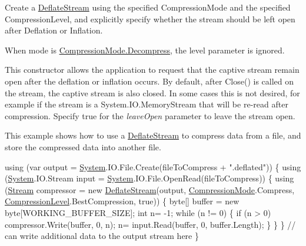Create a {\ttfamily \mbox{\hyperlink{class_super_tiled2_unity_1_1_ionic_1_1_zlib_1_1_deflate_stream}{Deflate\+Stream}}} using the specified {\ttfamily Compression\+Mode} and the specified {\ttfamily Compression\+Level}, and explicitly specify whether the stream should be left open after Deflation or Inflation. 

When mode is {\ttfamily \mbox{\hyperlink{namespace_super_tiled2_unity_1_1_ionic_1_1_zlib_ad5b7635d92497e1c905e5de82eb1c6b1a6d2861192fdf4370bcf95c099be0f2f0}{Compression\+Mode.\+Decompress}}}, the level parameter is ignored. 

This constructor allows the application to request that the captive stream remain open after the deflation or inflation occurs. By default, after {\ttfamily Close()} is called on the stream, the captive stream is also closed. In some cases this is not desired, for example if the stream is a System.\+I\+O.\+Memory\+Stream that will be re-\/read after compression. Specify true for the {\itshape leave\+Open}  parameter to leave the stream open. 

This example shows how to use a {\ttfamily \mbox{\hyperlink{class_super_tiled2_unity_1_1_ionic_1_1_zlib_1_1_deflate_stream}{Deflate\+Stream}}} to compress data from a file, and store the compressed data into another file.


\begin{DoxyCode}
\textcolor{keyword}{using} (var output = \mbox{\hyperlink{namespace_system}{System}}.IO.File.Create(fileToCompress + \textcolor{stringliteral}{".deflated"}))
\{
    \textcolor{keyword}{using} (\mbox{\hyperlink{namespace_system}{System}}.IO.Stream input = \mbox{\hyperlink{namespace_system}{System}}.IO.File.OpenRead(fileToCompress))
    \{
        \textcolor{keyword}{using} (\mbox{\hyperlink{namespace_super_tiled2_unity_1_1_ionic_1_1_zip_a9ced5352c56e7e0fceff15b534073c83aeae835e83c0494a376229f254f7d3392}{Stream}} compressor = \textcolor{keyword}{new} \mbox{\hyperlink{class_super_tiled2_unity_1_1_ionic_1_1_zlib_1_1_deflate_stream_af95bf312acc17bc60b20767178959549}{DeflateStream}}(output, 
      \mbox{\hyperlink{namespace_super_tiled2_unity_1_1_ionic_1_1_zlib_ad5b7635d92497e1c905e5de82eb1c6b1}{CompressionMode}}.Compress, \mbox{\hyperlink{namespace_super_tiled2_unity_1_1_ionic_1_1_zlib_a20f6771804996c363f454ad9765cd7db}{CompressionLevel}}.BestCompression, \textcolor{keyword}{true}))
        \{
            byte[] buffer = \textcolor{keyword}{new} byte[WORKING\_BUFFER\_SIZE];
            \textcolor{keywordtype}{int} n= -1;
            \textcolor{keywordflow}{while} (n != 0)
            \{
                \textcolor{keywordflow}{if} (n > 0)
                    compressor.Write(buffer, 0, n);
                n= input.Read(buffer, 0, buffer.Length);
            \}
        \}
    \}
    \textcolor{comment}{// can write additional data to the output stream here}
\}
\end{DoxyCode}



